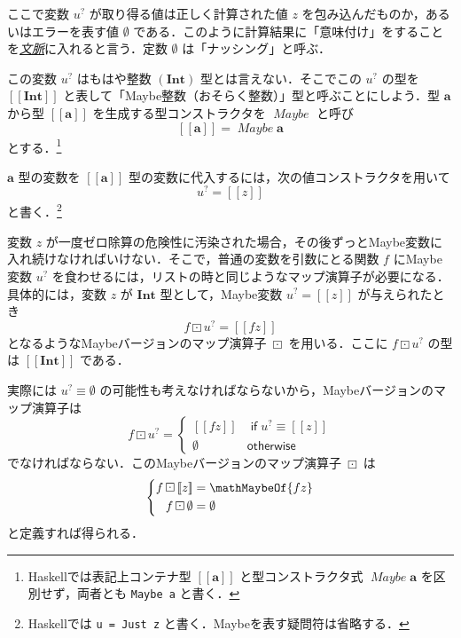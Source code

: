 \documentclass[a4paper]{jsbook}
\def\[{\left[\!\left[}
\def\]{\right]\!\right]}
\newcommand{\programminglanguage}[1]{\textsf{#1}}
\newcommand{\haskell}{\programminglanguage{Haskell}}
\newcommand{\keyword}[1]{{\underline{\emph{#1}}}}
\newcommand{\code}[1]{\texttt{#1}}
\newcommand{\mMaybeWith}[1]{\[#1\]}
\newcommand{\mType}[1]{\mathbf{#1}}
\newcommand{\mIntType}{\mType{Int}}
\newcommand{\mMaybeType}[1]{\mMaybeWith{\mType{#1}}}
\newcommand{\mTypeConstructor}[1]{\mathit{#1}} %
\newcommand{\mNothing}{\emptyset}
\newcommand{\mKeyword}[1]{\mathsf{#1}}
\newcommand{\mIfKeyword}{\mKeyword{if}}
\newcommand{\mOtherwiseKeyword}{\mKeyword{otherwise}}
\newcommand{\mMaybe}[1]{{#1}^\text{?}}
\DeclareMathOperator{\mMapMaybe}{\boxdot}
\DeclareMathOperator{\mMaybeTypeConstructor}{\mTypeConstructor{Maybe}}
\DeclareMathOperator{\mIf}{\mIfKeyword}
\DeclareMathOperator{\mOtherwise}{\mOtherwiseKeyword}
\begin{document}
ここで変数 $\mMaybe{u}$ が取り得る値は正しく計算された値 $z$ を包み込んだものか，あるいはエラーを表す値 $\mNothing$ である．このように計算結果に「意味付け」をすることを\keyword{文脈}に入れると言う．定数 $\mNothing$ は「ナッシング」と呼ぶ．

この変数 $\mMaybe{u}$ はもはや整数 $(\mIntType)$ 型とは言えない．そこでこの $\mMaybe{u}$ の型を $\mMaybeType{\mIntType}$ と表して「Maybe整数（おそらく整数）」型と呼ぶことにしよう．型 $\mType{a}$ から型 $\mMaybeType{a}$ を生成する型コンストラクタを $\mMaybeTypeConstructor$ と呼び
\begin{equation}
\mMaybeType{a}=\mMaybeTypeConstructor\mType{a}
\end{equation}
とする．\footnote{\haskell では表記上コンテナ型 $\mMaybeType{a}$ と型コンストラクタ式 $\mMaybeTypeConstructor\mType{a}$ を区別せず，両者とも \code{Maybe a} と書く．}

$\mType{a}$ 型の変数を $\mMaybeType{a}$ 型の変数に代入するには，次の値コンストラクタを用いて
\begin{equation}
\mMaybe{u}=\mMaybeWith{z}
\end{equation}
と書く．\footnote{\haskell では \code{u = Just z} と書く．Maybeを表す疑問符は省略する．}

変数 $z$ が一度ゼロ除算の危険性に汚染された場合，その後ずっとMaybe変数に入れ続けなければいけない．そこで，普通の変数を引数にとる関数 $f$ にMaybe変数 $\mMaybe{u}$ を食わせるには，リストの時と同じようなマップ演算子が必要になる．具体的には，変数 $z$ が $\mType{Int}$ 型として，Maybe変数 $\mMaybe{u}=\mMaybeWith{z}$ が与えられたとき
\begin{equation}
f\mMapMaybe\mMaybe{u}=\mMaybeWith{fz}
\end{equation}
となるようなMaybeバージョンのマップ演算子 $\mMapMaybe$ を用いる．ここに $f\mMapMaybe\mMaybe{u}$ の型は $\mMaybeType{\mIntType}$ である．

実際には $\mMaybe{u}\equiv\mNothing$ の可能性も考えなければならないから，Maybeバージョンのマップ演算子は
\begin{equation}
f\mMapMaybe\mMaybe{u}=\begin{cases}
\mMaybeWith{fz}&\mIf\mMaybe{u}\equiv\mMaybeWith{z}\\
\mNothing&\mOtherwise
\end{cases}
\end{equation}
でなければならない．このMaybeバージョンのマップ演算子 $\mMapMaybe$ は
\begin{equation}
\left\{
\begin{split}
f\mMapMaybe\mMaybeWith{z}&=\mathMaybeOf{fz}\\
f\mMapMaybe\mNothing&=\mNothing
\end{split}
\right.
\end{equation}
と定義すれば得られる．
\end{document}
